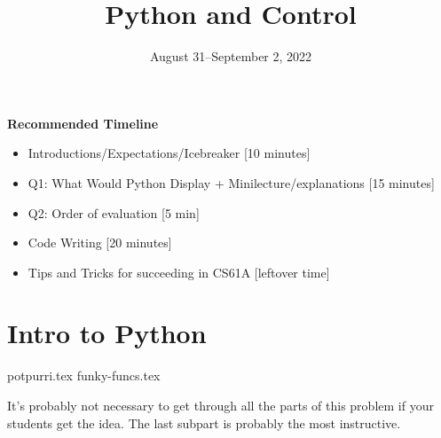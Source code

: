 \documentclass{exam}
\title{Python and Control}
\date{August 31--September 2, 2022}
\begin{document}
\maketitle
\begin{meta}
\textbf{Recommended Timeline}
\begin{itemize}
  \item Introductions/Expectations/Icebreaker [10 minutes]
  \item Q1: What Would Python Display + Minilecture/explanations [15 minutes]
  \item Q2: Order of evaluation [5 min]
  \item Code Writing [20 minutes]
  \item Tips and Tricks for succeeding in CS61A [leftover time]
\end{itemize}
\end{meta}


\section{Intro to Python}
\begin{questions}
{potpurri.tex}
{funky-funcs.tex}
\begin{questionmeta}
  It's probably not necessary to get through all the parts of this problem if your students get the idea. The last subpart is probably the most instructive. 
\end{questionmeta}
\end{questions}
\end{document}
